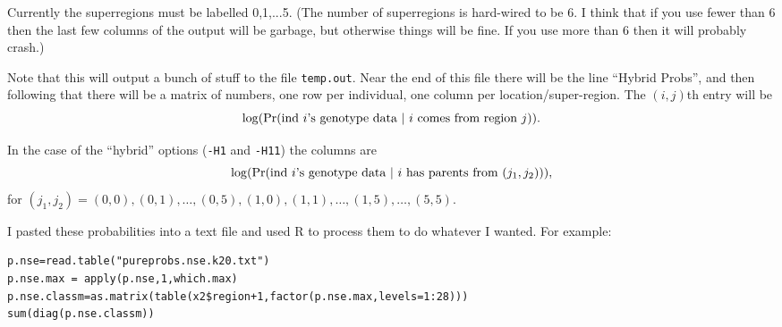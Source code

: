 \documentclass[11pt,titlepage,times,letterpaper]{article}
\def \Pr{{\rm Pr}}
\begin{document}
\begin{enumerate}[{\tt -f}]
Currently the superregions must be labelled 0,1,...5. (The number of
superregions is hard-wired to be 6. I think that if you use fewer than
6 then the last few columns of the output will be garbage, but
otherwise things will be fine. If you use more than 6 then it will
probably crash.)

Note that this will output a bunch of stuff to the file {\tt temp.out}. Near
the end of this file there will be the line ``Hybrid Probs'', and
then following that there will be a matrix of numbers, one row per
individual, one column per location/super-region. The $(i,j)$th entry
will be $$\log(\Pr(\text{ind $i$'s genotype data $\mid$ $i$ comes from region $j$})).$$

In the case of the ``hybrid'' options ({\tt -H1} and {\tt -H11}) the columns are
$$\log(\Pr(\text{ind $i$'s genotype data $\mid$ $i$ has parents from $(j_1,j_2)$})),$$
for $(j_1,j_2) = (0,0), (0,1),\dots,(0,5),(1,0),(1,1),\dots,(1,5),\dots, (5,5)$.

I pasted these probabilities into a text file and used R to process them to
do whatever I wanted. For example:
\begin{verbatim}
p.nse=read.table("pureprobs.nse.k20.txt")
p.nse.max = apply(p.nse,1,which.max)
p.nse.classm=as.matrix(table(x2$region+1,factor(p.nse.max,levels=1:28)))
sum(diag(p.nse.classm))
\end{verbatim}

\end{enumerate}



\end{document}
